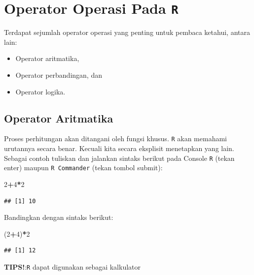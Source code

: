\documentclass[12pt,]{krantz}
\newenvironment{Shaded}{\begin{snugshade}}{\end{snugshade}}
\newcommand{\DecValTok}[1]{\textcolor[rgb]{0.00,0.00,0.81}{#1}}
\newcommand{\NormalTok}[1]{#1}
\newcommand{\OperatorTok}[1]{\textcolor[rgb]{0.81,0.36,0.00}{\textbf{#1}}}
\providecommand{\tightlist}{%
  \setlength{\itemsep}{0pt}\setlength{\parskip}{0pt}}
\renewenvironment{quote}{\begin{VF}}{\end{VF}}
\begin{document}
\hypertarget{opop}{%
\section{\texorpdfstring{Operator Operasi Pada \texttt{R}}{Operator Operasi Pada R}}\label{opop}}

Terdapat sejumlah operator operasi yang penting untuk pembaca ketahui, antara lain:

\begin{itemize}
\tightlist
\item
  Operator aritmatika,
\item
  Operator perbandingan, dan
\item
  Operator logika.
\end{itemize}

\hypertarget{aritmatikop}{%
\subsection{Operator Aritmatika}\label{aritmatikop}}

Proses perhitungan akan ditangani oleh fungsi khusus. \texttt{R} akan memahami urutannya secara benar. Kecuali kita secara eksplisit menetapkan yang lain. Sebagai contoh tuliskan dan jalankan sintaks berikut pada Console \texttt{R} (tekan enter) maupun \texttt{R\ Commander} (tekan tombol submit):

\begin{Shaded}
\begin{Highlighting}[]
\DecValTok{2}\OperatorTok{+}\DecValTok{4}\OperatorTok{*}\DecValTok{2}
\end{Highlighting}
\end{Shaded}

\begin{verbatim}
## [1] 10
\end{verbatim}

Bandingkan dengan sintaks berikut:

\begin{Shaded}
\begin{Highlighting}[]
\NormalTok{(}\DecValTok{2}\OperatorTok{+}\DecValTok{4}\NormalTok{)}\OperatorTok{*}\DecValTok{2}
\end{Highlighting}
\end{Shaded}

\begin{verbatim}
## [1] 12
\end{verbatim}

\begin{quote}
\textbf{TIPS!}:\texttt{R} dapat digunakan sebagai kalkulator
\end{quote}
\end{document}
